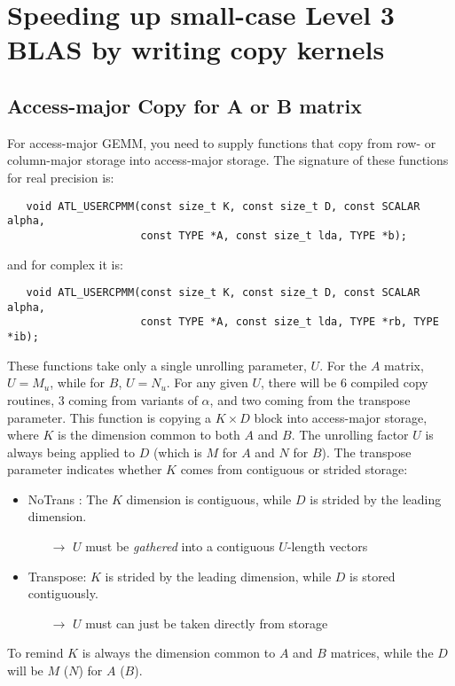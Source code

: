 \documentclass[11pt]{article}
\begin{document}
\newpage
\section{Speeding up small-case Level 3 BLAS by writing copy kernels}
\subsection{Access-major Copy for A or B matrix}
For access-major GEMM, you need to supply functions that copy from
row- or column-major storage into access-major storage.  The signature of
these functions for real precision is:
\begin{verbatim}
   void ATL_USERCPMM(const size_t K, const size_t D, const SCALAR alpha,
                     const TYPE *A, const size_t lda, TYPE *b);
\end{verbatim}
and for complex it is:
\begin{verbatim}
   void ATL_USERCPMM(const size_t K, const size_t D, const SCALAR alpha,
                     const TYPE *A, const size_t lda, TYPE *rb, TYPE *ib);
\end{verbatim}

These functions take only a single unrolling parameter, $U$.  For the $A$
matrix, $U = M_u$, while for $B$, $U = N_u$.  For any given $U$, there will
be 6 compiled copy routines, 3 coming from variants of $\alpha$, and two
coming from the transpose parameter.  
This function is copying a $K \times D$ block into access-major storage,
where $K$ is the dimension common to both $A$ and $B$.  The unrolling factor
$U$ is always being applied to $D$ (which is $M$ for $A$ and $N$ for $B$).
The transpose parameter indicates whether $K$ comes from contiguous or
strided storage:
\begin{itemize}
\item NoTrans : The $K$ dimension is contiguous, while $D$ is strided by the
                leading dimension.
   \begin{itemize}
   \item [$\rightarrow$] $U$ must be {\em gathered} into a contiguous $U$-length vectors
   \end{itemize}
\item Transpose: $K$ is strided by the leading dimension, while $D$ is
                 stored contiguously.
   \begin{itemize}
   \item [$\rightarrow$] $U$ must can just be taken directly from storage
   \end{itemize}
\end{itemize}
To remind $K$ is always the dimension common to $A$ and $B$ matrices,
while the $D$ will be $M$ ($N$) for $A$ ($B$).
\end{document}
